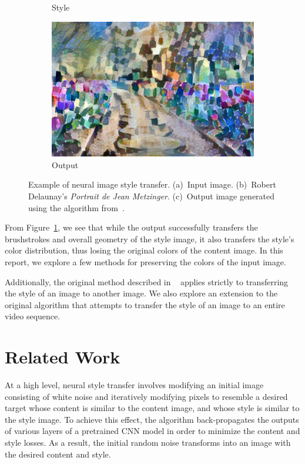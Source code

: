 \documentclass[10pt,twocolumn,letterpaper]{article}
\begin{document}
\begin{figure}[ht]
\begin{subfigure}[b]{0.195\linewidth}
  \caption{Style}
\end{subfigure}
\begin{subfigure}[b]{0.39\linewidth}
  \centering
  \includegraphics[width=\linewidth]{imgs/flowers-delaunay.jpg}
  \caption{Output}
\end{subfigure}
\caption{Example of neural image style transfer. (a)~Input image. (b)~Robert Delaunay's \textit{Portrait de Jean Metzinger}. (c)~Output image generated using the algorithm from~\cite{gatys-orig}.}
\label{fig:orig}
\end{figure}

From Figure~\ref{fig:orig}, we see that while the output successfully transfers the brushstrokes and overall geometry of the style image, it also transfers the style's color distribution, thus losing the original colors of the content image. In this report, we explore a few methods for preserving the colors of the input image.

Additionally, the original method described in ~\cite{gatys-orig} applies strictly to transferring the style of an image to another image. We also explore an extension to the original algorithm that attempts to transfer the style of an image to an entire video sequence.

\section{Related Work}
At a high level, neural style transfer involves modifying an initial image consisting of white noise and iteratively modifying pixels to resemble a desired target whose content is similar to the content image, and whose style is similar to the style image. To achieve this effect, the algorithm back-propagates the outputs of various layers of a pretrained CNN model in order to minimize the content and style losses. As a result, the initial random noise transforms into an image with the desired content and style.
\end{document}
